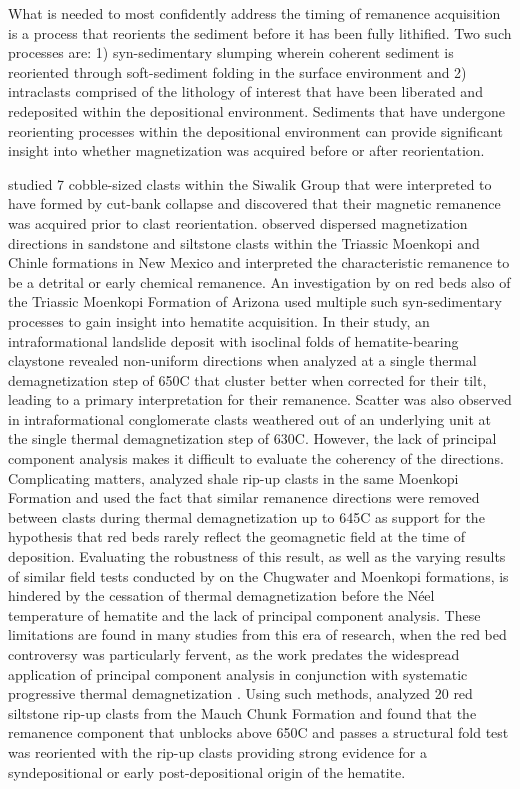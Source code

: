 \documentclass[draft]{agujournal2019}
\begin{document}
What is needed to most confidently address the timing of remanence acquisition is a process that reorients the sediment before it has been fully lithified. Two such processes are: 1) syn-sedimentary slumping wherein coherent sediment is reoriented through soft-sediment folding in the surface environment and 2) intraclasts comprised of the lithology of interest that have been liberated and redeposited within the depositional environment. Sediments that have undergone reorienting processes within the depositional environment can provide significant insight into whether magnetization was acquired before or after reorientation.

 studied 7 cobble-sized clasts within the Siwalik Group that were interpreted to have formed by cut-bank collapse and discovered that their magnetic remanence was acquired prior to clast reorientation.  observed dispersed magnetization directions in sandstone and siltstone clasts within the Triassic Moenkopi and Chinle formations in New Mexico and interpreted the characteristic remanence to be a detrital or early chemical remanence. An investigation by  on red beds also of the Triassic Moenkopi Formation of Arizona used multiple such syn-sedimentary processes to gain insight into hematite acquisition. In their study, an intraformational landslide deposit with isoclinal folds of hematite-bearing claystone revealed non-uniform directions when analyzed at a single thermal demagnetization step of 650\textdegree C that cluster better when corrected for their tilt, leading to a primary interpretation for their remanence. Scatter was also observed in intraformational conglomerate clasts weathered out of an underlying unit at the single thermal demagnetization step of 630\textdegree C. However, the lack of principal component analysis makes it difficult to evaluate the coherency of the directions. Complicating matters,  analyzed shale rip-up clasts in the same Moenkopi Formation and used the fact that similar remanence directions were removed between clasts during thermal demagnetization up to 645\textdegree C as support for the hypothesis that red beds rarely reflect the geomagnetic field at the time of deposition. Evaluating the robustness of this result, as well as the varying results of similar field tests conducted by  on the Chugwater and Moenkopi formations, is hindered by the cessation of thermal demagnetization before the N\'eel temperature of hematite and the lack of principal component analysis. These limitations are found in many studies from this era of research, when the red bed controversy was particularly fervent, as the work predates the widespread application of principal component analysis in conjunction with systematic progressive thermal demagnetization \cite{Kirschvink1980a, Van-Der-Voo2012a}. Using such methods,  analyzed 20 red siltstone rip-up clasts from the Mauch Chunk Formation and found that the remanence component that unblocks above 650\textdegree C and passes a structural fold test was reoriented with the rip-up clasts providing strong evidence for a syndepositional or early post-depositional origin of the hematite.
\end{document}
